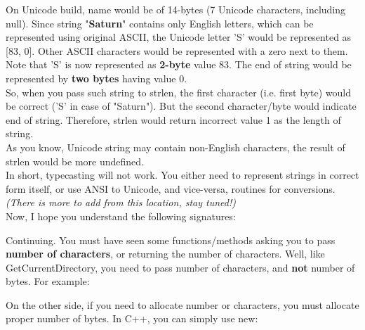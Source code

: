 	
	On Unicode build, name would be of 14-bytes (7 Unicode characters, including null). Since string "\textbf{Saturn}" contains only English letters, which can be represented using original ASCII, the Unicode letter 'S' would be represented as [83, 0]. Other ASCII characters would be represented with a zero next to them. Note that 'S' is now represented as \textbf{2-byte} value 83. The end of string would be represented by \textbf{two bytes} having value 0.\\
	
	So, when you pass such string to strlen, the first character (i.e. first byte) would be correct ('S' in case of "Saturn"). But the second character/byte would indicate end of string. Therefore, strlen would return incorrect value 1 as the length of string.\\
	
	As you know, Unicode string may contain non-English characters, the result of strlen would be more undefined.\\
	
	In short, typecasting will not work. You either need to represent strings in correct form itself, or use ANSI to Unicode, and vice-versa, routines for conversions.\\
	
	\textit{(There is more to add from this location, stay tuned!)}\\
	
	Now, I hope you understand the following signatures:\\
	
	
	Continuing. You must have seen some functions/methods asking you to pass \textbf{number of characters}, or returning the number of characters. Well, like GetCurrentDirectory, you need to pass number of characters, and \textbf{not} number of bytes. For example:
	
	
	On the other side, if you need to allocate number or characters, you must allocate proper number of bytes. In C++, you can simply use new:\\
	
